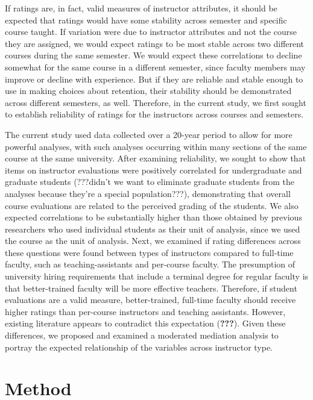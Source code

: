 \documentclass[man]{apa6}
\theoremstyle{definition}
\theoremstyle{definition}
\theoremstyle{definition}
\theoremstyle{remark}
\begin{document}
If ratings are, in fact, valid measures of instructor attributes, it
should be expected that ratings would have some stability across
semester and specific course taught. If variation were due to instructor
attributes and not the course they are assigned, we would expect ratings
to be most stable across two different courses during the same semester.
We would expect these correlations to decline somewhat for the same
course in a different semester, since faculty members may improve or
decline with experience. But if they are reliable and stable enough to
use in making choices about retention, their stability should be
demonstrated across different semesters, as well. Therefore, in the
current study, we first sought to establish reliability of ratings for
the instructors across courses and semesters.

The current study used data collected over a 20-year period to allow for
more powerful analyses, with such analyses occurring within many
sections of the same course at the same university. After examining
reliability, we sought to show that items on instructor evaluations were
positively correlated for undergraduate and graduate students (???didn't
we want to eliminate graduate students from the analyses because they're
a special population???), demonstrating that overall course evaluations
are related to the perceived grading of the students. We also expected
correlations to be substantially higher than those obtained by previous
researchers who used individual students as their unit of analysis,
since we used the course as the unit of analysis. Next, we examined if
rating differences across these questions were found between types of
instructors compared to full-time faculty, such as teaching-assistants
and per-course faculty. The presumption of university hiring
requirements that include a terminal degree for regular faculty is that
better-trained faculty will be more effective teachers. Therefore, if
student evaluations are a valid measure, better-trained, full-time
faculty should receive higher ratings than per-course instructors and
teaching assistants. However, existing literature appears to contradict
this expectation ({\textbf{???}}). Given these differences, we proposed
and examined a moderated mediation analysis to portray the expected
relationship of the variables across instructor type.

\hypertarget{method}{%
\section{Method}\label{method}}
\end{document}

